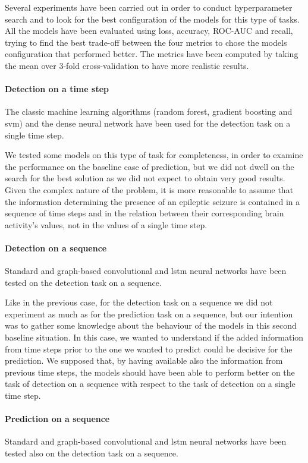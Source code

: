 Several experiments have been carried out in order to conduct hyperparameter search and to look for the best configuration of the models for this type of tasks. All the models have been evaluated using loss, accuracy, ROC-AUC and recall, trying to find the best trade-off between the four metrics to chose the models configuration that performed better. The metrics have been computed by taking the mean over 3-fold cross-validation to have more realistic results.

\paragraph{Detection on a time step} The classic machine learning algorithms (random forest, gradient boosting and \acs{svm}) and the dense neural network have been used for the detection task on a single time step.

We tested some models on this type of task for completeness, in order to examine the performance on the baseline case of prediction, but we did not dwell on the search for the best solution as we did not expect to obtain very good results. Given the complex nature of the problem, it is more reasonable to assume that the information determining the presence of an epileptic seizure is contained in a sequence of time steps and in the relation between their corresponding brain activity's values, not in the values of a single time step.

\paragraph{Detection on a sequence} Standard and graph-based convolutional and \acs{lstm} neural networks have been tested on the detection task on a sequence. 

Like in the previous case, for the detection task on a sequence we did not experiment as much as for the prediction task on a sequence, but our intention was to gather some knowledge about the behaviour of the models in this second baseline situation. In this case, we wanted to understand if the added information from time steps prior to the one we wanted to predict could be decisive for the prediction. We supposed that, by having available also the information from previous time steps, the models should have been able to perform better on the task of detection on a sequence with respect to the task of detection on a single time step.

\paragraph{Prediction on a sequence} Standard and graph-based convolutional and \acs{lstm} neural networks have been tested also on the detection task on a sequence.

